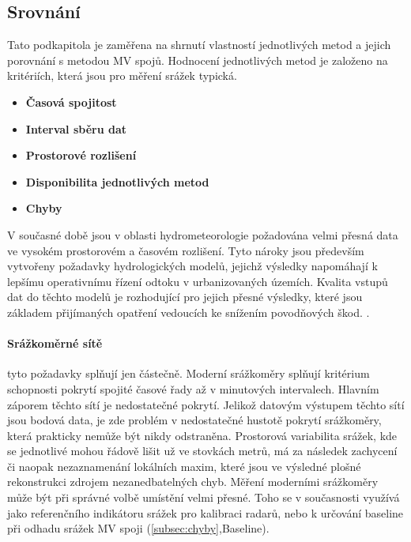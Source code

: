 \documentclass[a4paper,12pt]{report}
\begin{document}
\subsection{Srovnání}
Tato podkapitola je zaměřena na shrnutí vlastností jednotlivých metod a jejich porovnání s metodou MV spojů. Hodnocení jednotlivých metod je založeno na kritériích, která jsou pro měření srážek typická.
\begin{itemize}
\item\textbf{Časová spojitost}
\item\textbf{Interval sběru dat}  
\item\textbf{Prostorové rozlišení}
\item\textbf{Disponibilita jednotlivých metod}
\item\textbf{Chyby}
\end{itemize}
V současné době jsou v oblasti hydrometeorologie požadována velmi přesná data ve vysokém prostorovém a časovém rozlišení. Tyto nároky jsou především vytvořeny požadavky hydrologických modelů, jejichž výsledky napomáhají k lepšímu operativnímu řízení odtoku v urbanizovaných územích. Kvalita vstupů dat do těchto modelů je rozhodující pro jejich přesné výsledky, které jsou základem přijímaných opatření vedoucích ke snížením povodňových škod. .

\paragraph*{Srážkoměrné sítě} 
tyto požadavky splňují jen částečně. Moderní srážkoměry splňují kritérium schopnosti pokrytí spojité časové řady až v minutových intervalech. Hlavním záporem těchto sítí je nedostatečné pokrytí. Jelikož datovým výstupem těchto sítí jsou bodová data, je zde problém v nedostatečné hustotě pokrytí srážkoměry, která prakticky nemůže být nikdy odstraněna. Prostorová variabilita srážek, kde se jednotlivé mohou řádově lišit už ve stovkách metrů, má za následek zachycení či naopak nezaznamenání lokálních maxim, které jsou ve výsledné plošné rekonstrukci zdrojem nezanedbatelných chyb. Měření moderními srážkoměry může být při správné volbě umístění velmi přesné. Toho se v současnosti využívá jako referenčního indikátoru srážek pro kalibraci radarů, nebo k určování baseline při odhadu srážek MV spoji (\ref{subsec:chyby},Baseline).
\end{document}
